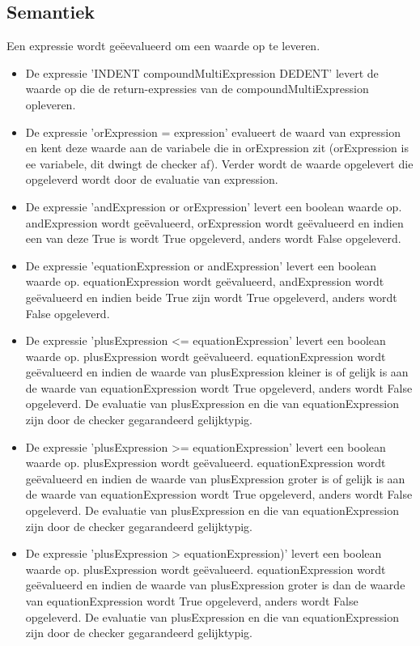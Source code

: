    \subsection{Semantiek}
        Een expressie wordt ge\"{e}evalueerd om een waarde op te leveren.
        \begin{itemize}
        \item De expressie 'INDENT compoundMultiExpression DEDENT' levert de waarde op die de return-expressies van de compoundMultiExpression opleveren.
        \item De expressie 'orExpression = expression' evalueert de waard van expression en kent deze waarde aan de variabele die in orExpression zit (orExpression is ee variabele, dit dwingt de checker af). Verder wordt de waarde opgelevert die opgeleverd wordt door de evaluatie van expression.
        \item De expressie 'andExpression or orExpression' levert een boolean waarde op. andExpression wordt ge\"{e}valueerd, orExpression wordt ge\"{e}valueerd en indien een van deze True is wordt True opgeleverd, anders wordt False opgeleverd.
        \item De expressie 'equationExpression or andExpression' levert een boolean waarde op. equationExpression wordt ge\"{e}valueerd, andExpression wordt ge\"{e}valueerd en indien beide True zijn wordt True opgeleverd, anders wordt False opgeleverd.
        \item De expressie 'plusExpression \textless{}= equationExpression' levert een boolean waarde op. plusExpression wordt ge\"{e}valueerd. equationExpression wordt ge\"{e}valueerd en indien de waarde van plusExpression kleiner is of gelijk is aan de waarde van equationExpression wordt True opgeleverd, anders wordt False opgeleverd. De evaluatie van plusExpression en die van equationExpression zijn door de checker gegarandeerd gelijktypig.
        \item De expressie 'plusExpression \textgreater{}= equationExpression' levert een boolean waarde op. plusExpression wordt ge\"{e}valueerd. equationExpression wordt ge\"{e}valueerd en indien de waarde van plusExpression groter is of gelijk is aan de waarde van equationExpression wordt True opgeleverd, anders wordt False opgeleverd. De evaluatie van plusExpression en die van equationExpression zijn door de checker gegarandeerd gelijktypig.
        \item De expressie 'plusExpression \textgreater{} equationExpression)' levert een boolean waarde op. plusExpression wordt ge\"{e}valueerd. equationExpression wordt ge\"{e}valueerd en indien de waarde van plusExpression groter is dan de waarde van equationExpression wordt True opgeleverd, anders wordt False opgeleverd. De evaluatie van plusExpression en die van equationExpression zijn door de checker gegarandeerd gelijktypig.

\end{itemize}
